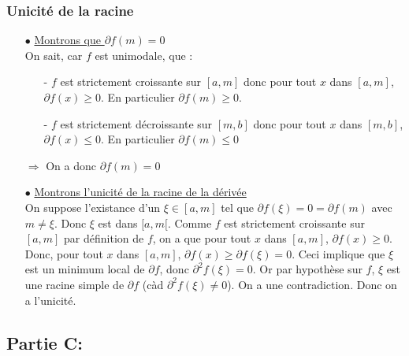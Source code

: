 \documentclass[a4paper, 12pt]{article}
\begin{document}
\subsubsection{Unicité de la racine}

\begin{itemize}
	\item[$\bullet$] \underline{Montrons que $\partial f(m) =0 $} \\
		On sait, car $f$ est unimodale, que :
		\begin{itemize}
			\item[-] $f$ est strictement croissante sur $[a,m]$ donc pour tout $x$ dans $[a,m]$, $\partial f(x) \geqslant 0$. En particulier $\partial f(m) \geqslant 0$.
			\item[-] $f$ est strictement décroissante sur $[m,b]$ donc pour tout $x$ dans $[m,b]$, $\partial f(x) \leqslant 0 $. En particulier $\partial f(m) \leqslant 0$
		\end{itemize}
		$\Rightarrow$ On a donc $\partial f(m) = 0$
	\item[$\bullet$] \underline{Montrons l'unicité de la racine de la dérivée} \\
		On suppose l'existance d'un $\xi \in [a,m]$ tel que $ \partial f(\xi) = 0 = \partial f(m)$ avec $ m \neq \xi$. Donc $\xi$ est dans $[a,m[$. Comme $f$ est strictement croissante sur $[a,m]$ par définition de $f$, on a que pour tout $x$ dans $[a,m]$, $\partial f(x) \geqslant 0$. Donc, pour tout $x$ dans $[a,m]$, $\partial f(x) \geqslant \partial f(\xi) = 0$. Ceci implique que $\xi$ est un minimum local de $\partial f$, donc $\partial^2 f(\xi) = 0$. Or par hypothèse sur $f$, $\xi$ est une racine simple de $\partial f$ (càd $\partial^2 f(\xi) \neq 0$). On a une contradiction. Donc on a l'unicité.
\end{itemize}


\newpage

\subsection{Partie C:}
\end{document}
